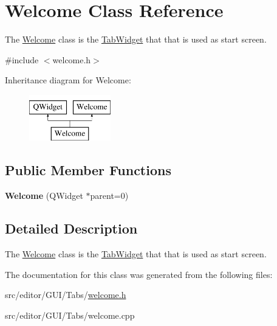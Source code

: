 \hypertarget{class_welcome}{\section{\-Welcome \-Class \-Reference}
\label{class_welcome}
}


\-The \hyperlink{class_welcome}{\-Welcome} class is the \hyperlink{class_tab_widget}{\-Tab\-Widget} that that is used as start screen.  




{\ttfamily \#include $<$welcome.\-h$>$}

\-Inheritance diagram for \-Welcome\-:\begin{figure}[H]
\begin{center}
\leavevmode
\includegraphics[height=2.000000cm]{class_welcome}
\end{center}
\end{figure}
\subsection*{\-Public \-Member \-Functions}
\begin{DoxyCompactItemize}
\item 
\hypertarget{class_welcome_acf62624f1107ddc68761d25febbf10ad}{{\bfseries \-Welcome} (\-Q\-Widget $\ast$parent=0)}\label{class_welcome_acf62624f1107ddc68761d25febbf10ad}

\end{DoxyCompactItemize}


\subsection{\-Detailed \-Description}
\-The \hyperlink{class_welcome}{\-Welcome} class is the \hyperlink{class_tab_widget}{\-Tab\-Widget} that that is used as start screen. 

\-The documentation for this class was generated from the following files\-:\begin{DoxyCompactItemize}
\item 
src/editor/\-G\-U\-I/\-Tabs/\hyperlink{welcome_8h}{welcome.\-h}\item 
src/editor/\-G\-U\-I/\-Tabs/welcome.\-cpp\end{DoxyCompactItemize}
